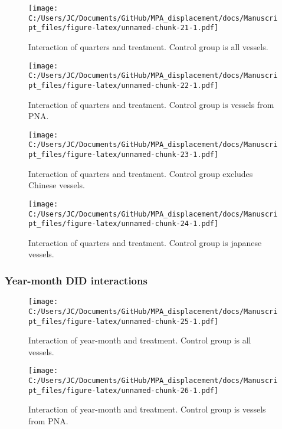 \documentclass[11pt,]{article}
\begin{document}
\begin{figure}
\centering
\texttt{[image: C:/Users/JC/Documents/GitHub/MPA\_displacement/docs/Manuscript\_files/figure-latex/unnamed-chunk-21-1.pdf]}
\caption{\label{fig:unnamed-chunk-21}\label{fig:q1}Interaction of quarters
and treatment. Control group is all vessels.}
\end{figure}

\begin{figure}
\centering
\texttt{[image: C:/Users/JC/Documents/GitHub/MPA\_displacement/docs/Manuscript\_files/figure-latex/unnamed-chunk-22-1.pdf]}
\caption{\label{fig:unnamed-chunk-22}\label{fig:q2}Interaction of quarters
and treatment. Control group is vessels from PNA.}
\end{figure}

\begin{figure}
\centering
\texttt{[image: C:/Users/JC/Documents/GitHub/MPA\_displacement/docs/Manuscript\_files/figure-latex/unnamed-chunk-23-1.pdf]}
\caption{\label{fig:unnamed-chunk-23}\label{fig:q3}Interaction of quarters
and treatment. Control group excludes Chinese vessels.}
\end{figure}

\begin{figure}
\centering
\texttt{[image: C:/Users/JC/Documents/GitHub/MPA\_displacement/docs/Manuscript\_files/figure-latex/unnamed-chunk-24-1.pdf]}
\caption{\label{fig:unnamed-chunk-24}\label{fig:q4}Interaction of quarters
and treatment. Control group is japanese vessels.}
\end{figure}

\hypertarget{year-month-did-interactions}{%
\subsubsection{Year-month DID
interactions}\label{year-month-did-interactions}}

\begin{figure}
\centering
\texttt{[image: C:/Users/JC/Documents/GitHub/MPA\_displacement/docs/Manuscript\_files/figure-latex/unnamed-chunk-25-1.pdf]}
\caption{\label{fig:unnamed-chunk-25}\label{fig:ym1}Interaction of
year-month and treatment. Control group is all vessels.}
\end{figure}

\begin{figure}
\centering
\texttt{[image: C:/Users/JC/Documents/GitHub/MPA\_displacement/docs/Manuscript\_files/figure-latex/unnamed-chunk-26-1.pdf]}
\caption{\label{fig:unnamed-chunk-26}\label{fig:ym2}Interaction of
year-month and treatment. Control group is vessels from PNA.}
\end{figure}
\end{document}
